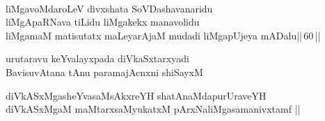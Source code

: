 \begin{entry}
\gl{}
\begin{shl}
\\
liMgavoMdaroLeV divxshata SoVDashavanaridu\\
liMgApaRNava tiLidu liMgakekx manavolidu\\
liMgamaM matisutatx maLeyarAjaM mudadi liMgapUjeya mADalu||\,60\,||
\end{shl}
\end{entry}

\begin{entry}
\begin{shl}
urutaravu keYvalayxpada diVkaSxtarxyadi\\
BavisuvAtana tAnu paramajAcnxni shiSayxM
\end{shl}
\end{entry}

\begin{entry}
\begin{shl}
diVkASxMgasheYvasaMsAkxreYH shatAnaMdapurUraveYH\\
diVkASxMgaM maMtarxsaMyukatxM pArxNaliMgasamanivxtamf ||
\end{shl}
\end{entry}

